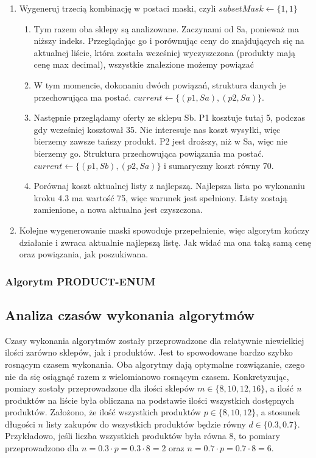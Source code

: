 \documentclass[a4paper]{article}
\begin{document}
\begin{enumerate}
{\begin{enumerate}
\end{enumerate}}
\item {Wygeneruj trzecią kombinację w postaci maski, czyli $subsetMask \leftarrow \{1, 1\}$
\begin{enumerate}
\item {Tym razem oba sklepy są analizowane. Zaczynami od Sa, ponieważ ma niższy indeks. Przeglądając go i porównując ceny do znajdujących się na aktualnej liście, która została wcześniej wyczyszczona (produkty mają cenę max decimal), wszystkie znalezione możemy powiązać}
\item{W tym momencie, dokonaniu dwóch powiązań, struktura danych je przechowująca ma postać.
$current \leftarrow \{(p1, Sa), (p2, Sa)\}$.}
\item{Następnie przeglądamy oferty ze sklepu Sb. P1 kosztuje tutaj 5, podczas gdy wcześniej kosztował 35. Nie interesuje nas koszt wysyłki, więc bierzemy zawsze tańszy produkt. P2 jest droższy, niż w Sa, więc nie bierzemy go. Struktura przechowująca powiązania ma postać.
$current \leftarrow \{(p1, Sb), (p2, Sa)\}$ i sumaryczny koszt równy 70.}
\item {Porównaj koszt aktualnej listy z najlepszą. Najlepsza lista po wykonaniu kroku 4.3 ma wartość 75, więc warunek jest spełniony. Listy zostają zamienione, a nowa aktualna jest czyszczona.}
\end{enumerate}}
\item{ Kolejne wygenerowanie maski spowoduje przepełnienie, więc algorytm kończy działanie i zwraca aktualnie najlepszą listę. Jak widać ma ona taką samą cenę oraz powiązania, jak poszukiwana.}
\end{enumerate}

\subsubsection{Algorytm PRODUCT-ENUM}
\subsection{Analiza czasów wykonania algorytmów}
Czasy wykonania algorytmów zostały przeprowadzone dla relatywnie niewielkiej ilości zarówno sklepów, jak i produktów. Jest to spowodowane bardzo szybko rosnącym czasem wykonania. Oba algorytmy dają optymalne rozwiązanie, czego nie da się osiągnąć razem z wielomianowo rosnącym czasem. Konkretyzując, pomiary zostały przeprowadzone dla ilości sklepów $m \in \{8, 10, 12, 16\}$, a ilość \textit{n} produktów na liście była obliczana na podstawie ilości wszystkich dostępnych produktów. Założono, że ilość wszystkich produktów $p \in \{8, 10, 12\}$, a stosunek długości $n$ listy zakupów do wszystkich produktów będzie równy $d \in \{0.3, 0.7\}$. Przykładowo, jeśli liczba wszystkich produktów była równa $8$, to pomiary przeprowadzono dla $n=0.3 \cdot p=0.3 \cdot 8 = 2$ oraz $n=0.7 \cdot p=0.7 \cdot 8 = 6$. 
\end{document}

